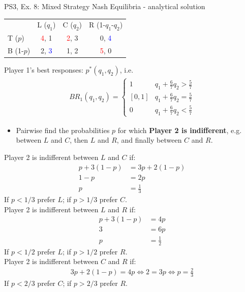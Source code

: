 \begin{frame}{PS3, Ex. 8: Mixed Strategy Nash Equilibria - analytical solution}
  \begin{multicols}{2}
    \begin{table}
      \begin{tabular}{l|c|c|c|}
          \multicolumn{1}{c}{}  & \multicolumn{1}{c}{L ($q_1$)} & \multicolumn{1}{c}{C ($q_2$)} & \multicolumn{1}{c}{R (1-$q_1$-$q_2$)} \\\cline{2-4}
          T ($p$)   & \textcolor{red}{4}, 1 & \textcolor{red}{2}, 3 & 0, \textcolor{blue}{4} \\\cline{2-4}
          B (1-$p$) & 2, \textcolor{blue}{3} & 1, 2 & \textcolor{red}{5}, 0 \\\cline{2-4}
      \end{tabular}
    \end{table}
    Player 1's best responses: $p^{*}(q_1,q_2)$, i.e.
    \begin{align*}
      BR_1(q_1,q_2)=
      \left\{ \begin{array}{ll}
          1                 & q_1 + \frac{6}{7}q_2 > \frac{5}{7}\\
          \left[0,1\right]  & q_1 + \frac{6}{7}q_2 = \frac{5}{7}\\
          0                 & q_1 + \frac{6}{7}q_2 < \frac{5}{7}
      \end{array}\right.
    \end{align*}
    \begin{itemize}
      \item[4.] Pairwise find the probabilities $p$ for which \textbf{Player 2 is indifferent}, e.g. between $L$ and $C$, then $L$ and $R$, and finally between $C$ and $R$.
    \end{itemize}
  \vfill\null \columnbreak
    Player 2 is indifferent between $L$ and $C$ if:
    \begin{align*}
      p+3(1-p)&= 3p + 2(1-p) \\
      1-p     &= 2p \\
      p       &= \frac{1}{3}
    \end{align*}
    If $p<1/3$ prefer $L$; if $p>1/3$ prefer $C$.\\\medskip
    Player 2 is indifferent between $L$ and $R$ if:
    \begin{align*}
      p+3(1-p)&= 4p \\
      3       &= 6p \\
      p       &= \frac{1}{2}
    \end{align*}
    If $p<1/2$ prefer $L$; if $p>1/2$ prefer $R$.\\\medskip
    Player 2 is indifferent between $C$ and $R$ if:
    \begin{align*}
      3p+2(1-p) = 4p \Leftrightarrow 2 = 3p \Leftrightarrow p = \frac{2}{3}
    \end{align*}
    If $p<2/3$ prefer $C$; if $p>2/3$ prefer $R$.\\\medskip
  \vfill\null
  \end{multicols}
\end{frame}
